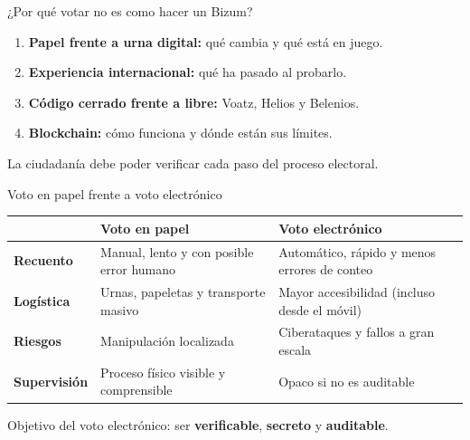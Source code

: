 \documentclass[aspectratio=169,12pt]{beamer}
\begin{document}
\begin{frame}{¿Por qué votar no es como hacer un Bizum?}
  \begin{enumerate}
    \item \textbf{Papel frente a urna digital:} qué cambia y qué está en juego.
    \item \textbf{Experiencia internacional:} qué ha pasado al probarlo.
    \item \textbf{Código cerrado frente a libre:} Voatz, Helios y Belenios.
    \item \textbf{Blockchain:} cómo funciona y dónde están sus límites.
  \end{enumerate}
  \vspace{0.4cm}
  {\large\alert{La ciudadanía debe poder verificar cada paso del proceso electoral.}}
\end{frame}

\begin{frame}{Voto en papel frente a voto electrónico}
  \begin{center}
  \small
  \renewcommand{\arraystretch}{1.25}
  \begin{tabular}{p{2.3cm} p{4.9cm} p{4.9cm}}
    & {\color{azul}\normalsize\bfseries Voto en papel} & {\color{terra}\normalsize\bfseries Voto electrónico} \\
    \hline
    \textbf{Recuento} & \raggedright Manual, lento y con posible error humano & \raggedright Automático, rápido y menos errores de conteo \tabularnewline
    \hline
    \textbf{Logística} & \raggedright Urnas, papeletas y transporte masivo & \raggedright Mayor accesibilidad (incluso desde el móvil) \tabularnewline
    \hline
    \textbf{Riesgos} & \raggedright Manipulación localizada & \raggedright Ciberataques y fallos a gran escala \tabularnewline
    \hline
    \textbf{Supervisión} & \raggedright Proceso físico visible y comprensible & \raggedright Opaco si no es auditable \tabularnewline
  \end{tabular}
  \end{center}
  \vspace{0.2cm}
  {\large\alert{Objetivo del voto electrónico:} ser \textbf{verificable}, \textbf{secreto} y \textbf{auditable}.}
\end{frame}
\end{document}
